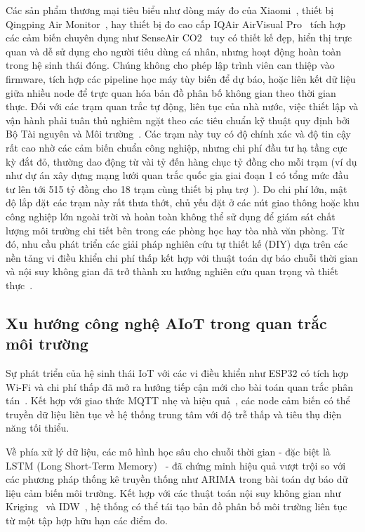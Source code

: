 Các sản phẩm thương mại tiêu biểu như dòng máy đo của Xiaomi~\cite{xiaomi_air_detector}, thiết bị Qingping Air Monitor~\cite{qingping_air_monitor}, hay thiết bị đo cao cấp IQAir AirVisual Pro~\cite{iqair_airvisual_specs} tích hợp các cảm biến chuyên dụng như SenseAir CO2~\cite{senseair_s8_datasheet} tuy có thiết kế đẹp, hiển thị trực quan và dễ sử dụng cho người tiêu dùng cá nhân, nhưng hoạt động hoàn toàn trong hệ sinh thái đóng. Chúng không cho phép lập trình viên can thiệp vào firmware, tích hợp các pipeline học máy tùy biến để dự báo, hoặc liên kết dữ liệu giữa nhiều node để trực quan hóa bản đồ phân bố không gian theo thời gian thực. Đối với các trạm quan trắc tự động, liên tục của nhà nước, việc thiết lập và vận hành phải tuân thủ nghiêm ngặt theo các tiêu chuẩn kỹ thuật quy định bởi Bộ Tài nguyên và Môi trường~\cite{monre_circular_10}. Các trạm này tuy có độ chính xác và độ tin cậy rất cao nhờ các cảm biến chuẩn công nghiệp, nhưng chi phí đầu tư hạ tầng cực kỳ đắt đỏ, thường dao động từ vài tỷ đến hàng chục tỷ đồng cho mỗi trạm (ví dụ như dự án xây dựng mạng lưới quan trắc quốc gia giai đoạn 1 có tổng mức đầu tư lên tới 515 tỷ đồng cho 18 trạm cùng thiết bị phụ trợ~\cite{monre_air_monitoring_project}). Do chi phí lớn, mật độ lắp đặt các trạm này rất thưa thớt, chủ yếu đặt ở các nút giao thông hoặc khu công nghiệp lớn ngoài trời và hoàn toàn không thể sử dụng để giám sát chất lượng môi trường chi tiết bên trong các phòng học hay tòa nhà văn phòng. Từ đó, nhu cầu phát triển các giải pháp nghiên cứu tự thiết kế (DIY) dựa trên các nền tảng vi điều khiển chi phí thấp kết hợp với thuật toán dự báo chuỗi thời gian và nội suy không gian đã trở thành xu hướng nghiên cứu quan trọng và thiết thực~\cite{Zheng2019,belavadi2020air}.

\subsection{Xu hướng công nghệ AIoT trong quan trắc môi trường}
\label{subsec:survey:trend}

Sự phát triển của hệ sinh thái IoT với các vi điều khiển như ESP32 có
tích hợp Wi-Fi và chi phí thấp đã mở ra hướng tiếp cận mới cho bài toán
quan trắc phân tán~\cite{shi2016edge}. Kết hợp với giao thức MQTT nhẹ
và hiệu quả~\cite{banks2014mqtt}, các node cảm biến có thể truyền dữ
liệu liên tục về hệ thống trung tâm với độ trễ thấp và tiêu thụ điện
năng tối thiểu.

Về phía xử lý dữ liệu, các mô hình học sâu cho chuỗi thời gian -
đặc biệt là LSTM (Long Short-Term Memory)~\cite{hochreiter1997lstm} -
đã chứng minh hiệu quả vượt trội so với các phương pháp thống kê
truyền thống như ARIMA trong bài toán dự báo dữ liệu cảm biến môi
trường. Kết hợp với các thuật toán nội suy không gian như
Kriging~\cite{cressie1990kriging} và IDW~\cite{shepard1968idw}, hệ
thống có thể tái tạo bản đồ phân bố môi trường liên tục từ một tập hợp
hữu hạn các điểm đo.

